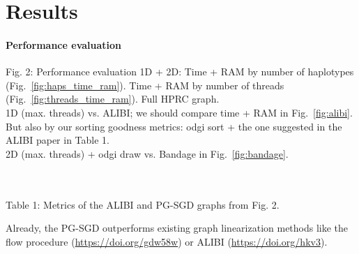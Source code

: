 \documentclass{bioinfo}
\theoremstyle{definition}
\begin{document}


    \iffalse
    Fig. 1: Describe how our approach works, especially a single update operation (Fig. \ref{fig:sketches}). Explanation of 1D graph updating in Figures \ref{fig:1d_before_update}-\ref{fig:1d_after_update}. Explanation of 2D graph updating in Figures \ref{fig:2d_before_update}-\ref{fig:2d_after_update}. Zipfian distribution.

    
    \fi

    \iffalse


    \section{Results}
    \label{sec:results}




    \paragraph{Performance evaluation}
    Fig. 2: Performance evaluation 1D + 2D: Time + RAM by number of haplotypes (Fig.~\ref{fig:haps_time_ram}). Time + RAM by number of threads (Fig.~\ref{fig:threads_time_ram}). Full HPRC graph.
    \\
    1D (max. threads) vs. ALIBI; we should compare time + RAM in Fig.~\ref{fig:alibi}.
    But also by our sorting goodness metrics: odgi sort + the one suggested in the ALIBI paper in Table 1.
    \\
    2D (max. threads) + odgi draw vs. Bandage in Fig.~\ref{fig:bandage}.
    
    \\
    \\
    Table 1: Metrics of the ALIBI and PG-SGD graphs from Fig. 2.
    
    Already, the PG-SGD outperforms existing graph linearization methods like the flow procedure (\url{https://doi.org/gdw58w}) or ALIBI (\url{https://doi.org/hkv3}).
\end{document}
